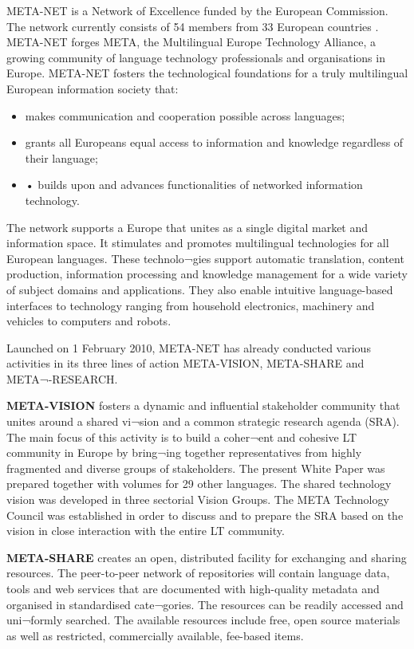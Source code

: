 \begin{multicols}{2}
META-NET is a Network of Excellence funded by the European Commission. The network currently consists of 54 members from 33 European countries \cite{rehm2011}. META-NET forges META, the Multilingual Europe Technology Alliance, a growing community of language technology professionals and organisations in Europe. META-NET fosters the technological foundations for a truly multilingual European information society that:

\begin{itemize}
\item makes communication and cooperation possible across languages;
\item grants all Europeans equal access to information and knowledge regardless of their language; 
\item •	builds upon and advances functionalities of networked information technology.
\end{itemize}

The network supports a Europe that unites as a single digital market and information space. It stimulates and promotes multilingual technologies for all European languages. These technolo¬gies support automatic translation, content production, information processing and knowledge management for a wide variety of subject domains and applications. They also enable intuitive language-based interfaces to technology ranging from household electronics, machinery and vehicles to computers and robots.

Launched on 1 February 2010, META-NET has already conducted various activities in its three lines of action META-VISION, META-SHARE and META¬-RESEARCH. 

\textbf{META-VISION} fosters a dynamic and inﬂuential stakeholder community that unites around a shared vi¬sion and a common strategic research agenda (SRA). The main focus of this activity is to build a coher¬ent and cohesive LT community in Europe by bring¬ing together representatives from highly fragmented and diverse groups of stakeholders. The present White Paper was prepared together with volumes for 29 other languages. The shared technology vision was developed in three sectorial Vision Groups. The META Technology Council was established in order to discuss and to prepare the SRA based on the vision in close interaction with the entire LT community. 

\textbf{META-SHARE} creates an open, distributed facility for exchanging and sharing resources. The peer-to-peer network of repositories will contain language data, tools and web services that are documented with high-quality metadata and organised in standardised cate¬gories. The resources can be readily accessed and uni¬formly searched. The available resources include free, open source materials as well as restricted, commercially available, fee-based items. 


\end{multicols}
